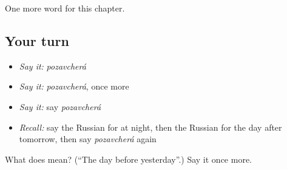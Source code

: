 \begin{grammarlens}[title={What you've built}]
One more word for this chapter.
\end{grammarlens}

\subsection*{Your turn}
\begin{itemize}
\raggedright
  \item \emph{Say it:} \emph{pozavcherá}
  \item \emph{Say it:} \emph{pozavcherá}, once more
  \item \emph{Say it:} say \emph{pozavcherá}
  \item \emph{Recall:} say the Russian for at night, then the Russian for the day after tomorrow, then say \emph{pozavcherá} again
\end{itemize}

\begin{tcolorbox}[breakable,colback=teal!4,colframe=teal!35!black,title={Before you move on}]
What does  mean? (\textquotedblleft{}The day before yesterday\textquotedblright{}.) Say it once more.
\end{tcolorbox}

